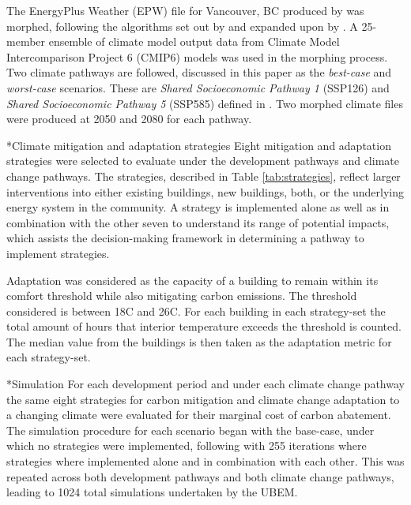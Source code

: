 \documentclass[twocolumn, a4paper,10pt]{article}
\makeatletter
\renewcommand\subsection{\@startsection{subsection}{1}{\z@}{\z@}{\z@}{\normalfont\normalsize\bfseries}}
\renewcommand\subsection{\@startsection{subsection}{1}{\z@}{\z@}{0.1pt}{\normalfont\normalsize\bfseries}}
\makeatother
\begin{document}
The EnergyPlus Weather (EPW) file for Vancouver, BC produced by \citet{cwec_2016} was morphed, following the algorithms set out by \citet{belcher_constructing_2005} and expanded upon by \citet{jentsch_climate_2008}. A 25-member ensemble of climate model output data from Climate Model Intercomparison Project 6 (CMIP6) models was used in the morphing process. Two climate pathways are followed, discussed in this paper as the \textit{best-case} and \textit{worst-case} scenarios. These are \textit{Shared Socioeconomic Pathway 1} (SSP126) and \textit{Shared Socioeconomic Pathway 5} (SSP585)
defined in \citet{oneill_roads_2017}. Two morphed climate files were produced at 2050 and 2080 for each pathway.

\subsection*{Climate mitigation and adaptation strategies}
Eight mitigation and adaptation strategies were selected to evaluate under the development pathways and climate change pathways. The strategies, described in Table \ref{tab:strategies}, reflect larger interventions into either existing buildings, new buildings, both, or the underlying energy system in the community. A strategy is implemented alone as well as in combination with the other seven to understand its range of potential impacts, which assists the decision-making framework in determining a pathway to implement strategies.

Adaptation was considered as the capacity of a building to remain within its comfort threshold while also mitigating carbon emissions. The threshold considered is between 18\textdegree C and 26\textdegree C. For each building in each strategy-set the total amount of hours that interior temperature exceeds the threshold is counted. The median value from the buildings is then taken as the adaptation metric for each strategy-set.

\subsection*{Simulation}
For each development period and under each climate change pathway the same eight strategies for carbon mitigation and climate change adaptation to a changing climate were evaluated for their marginal cost of carbon abatement. The simulation procedure for each scenario began with the base-case, under which no strategies were implemented, following with 255 iterations where strategies where implemented alone and in combination with each other. This was repeated across both development pathways and both climate change pathways, leading to 1024 total simulations undertaken by the UBEM.
\end{document}
